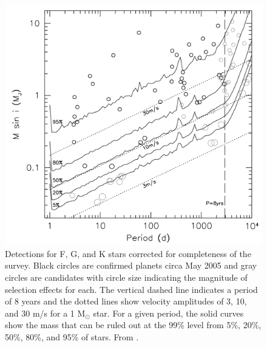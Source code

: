 \begin{figure}[ht!]
\centering
\includegraphics[width=5.5in]{./figures/cummingData}
 \caption[$m_P\sin I - P_{orb}$ Data]{ Detections for F, G, and K stars corrected for completeness of the survey. Black circles are confirmed planets circa May 2005 and gray circles are candidates with circle size indicating the magnitude of selection effects for each. The vertical dashed line indicates a period of 8 years and the dotted lines show velocity amplitudes of 3, 10, and 30 m/s for a 1 M$_\odot$ star. For a given period, the solid curves show the mass that can be ruled out at the 99\% level from 5\%, 20\%, 50\%, 80\%, and 95\% of stars. From \citet{cumming2008}.}
\label{fig:cummingData} 
\end{figure} 

